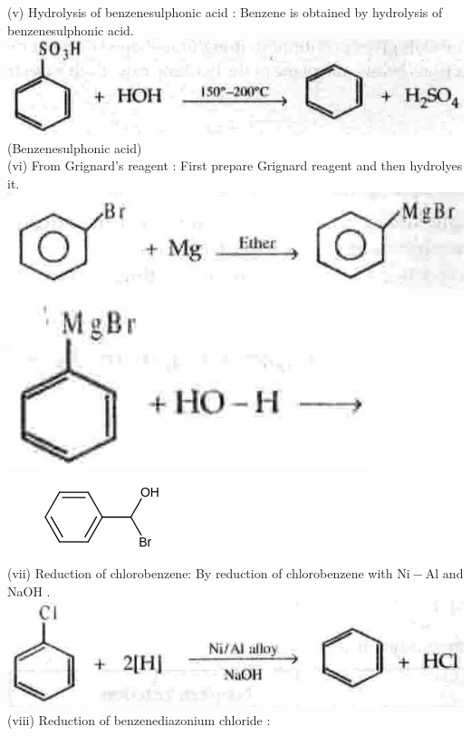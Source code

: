 \documentclass[10pt]{article}
\begin{document}
\begin{enumerate}
(v) Hydrolysis of benzenesulphonic acid : Benzene is obtained by hydrolysis of benzenesulphonic acid.\\
\includegraphics[max width=\textwidth, center]{2025_01_28_8470952b98110cec3aabg-204(1)}\\
(Benzenesulphonic acid)\\
(vi) From Grignard's reagent : First prepare Grignard reagent and then hydrolyes it.\\
\includegraphics[max width=\textwidth, center]{2025_01_28_8470952b98110cec3aabg-205(6)}\\
\includegraphics[max width=\textwidth, center]{2025_01_28_8470952b98110cec3aabg-205(2)}\\
\includegraphics{smile-db86265897d7bd63025329b9352f6c5c3aea8ba4}\\
(vii) Reduction of chlorobenzene: By reduction of chlorobenzene with $\mathrm{Ni}-\mathrm{Al}$ and NaOH .\\
\includegraphics[max width=\textwidth, center]{2025_01_28_8470952b98110cec3aabg-205(3)}\\
(viii) Reduction of benzenediazonium chloride :
\end{enumerate}
\end{document}
